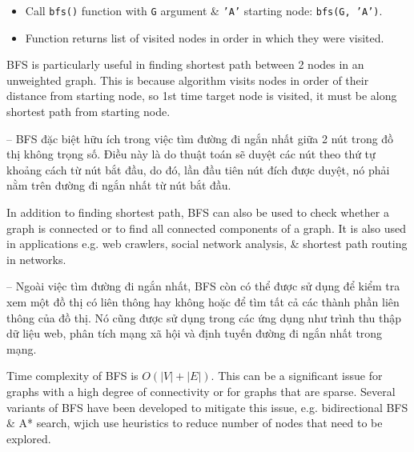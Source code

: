 \documentclass{article}
\begin{document}
\begin{itemize}
\begin{itemize}
\begin{itemize}
\begin{itemize}
                \item Call {\tt bfs()} function with {\tt G} argument \& {\tt'A'} starting node: {\tt bfs(G, 'A')}.
                \item Function returns list of visited nodes in order in which they were visited.
            \end{itemize}
            BFS is particularly useful in finding shortest path between 2 nodes in an unweighted graph. This is because algorithm visits nodes in order of their distance from starting node, so 1st time target node is visited, it must be along shortest path from starting node.

            -- BFS đặc biệt hữu ích trong việc tìm đường đi ngắn nhất giữa 2 nút trong đồ thị không trọng số. Điều này là do thuật toán sẽ duyệt các nút theo thứ tự khoảng cách từ nút bắt đầu, do đó, lần đầu tiên nút đích được duyệt, nó phải nằm trên đường đi ngắn nhất từ nút bắt đầu.

            In addition to finding shortest path, BFS can also be used to check whether a graph is connected or to find all connected components of a graph. It is also used in applications e.g. web crawlers, social network analysis, \& shortest path routing in networks.

            -- Ngoài việc tìm đường đi ngắn nhất, BFS còn có thể được sử dụng để kiểm tra xem một đồ thị có liên thông hay không hoặc để tìm tất cả các thành phần liên thông của đồ thị. Nó cũng được sử dụng trong các ứng dụng như trình thu thập dữ liệu web, phân tích mạng xã hội và định tuyến đường đi ngắn nhất trong mạng.

            Time complexity of BFS is $O(|V| + |E|)$. This can be a significant issue for graphs with a high degree of connectivity or for graphs that are sparse. Several variants of BFS have been developed to mitigate this issue, e.g. bidirectional BFS \& A* search, wjich use heuristics to reduce number of nodes that need to be explored.


\end{itemize}
\end{itemize}
\end{itemize}
\end{document}
